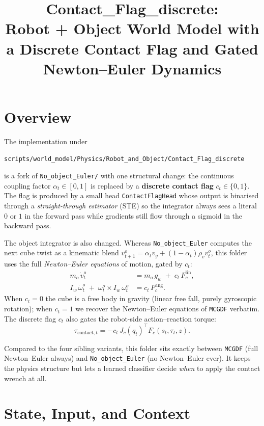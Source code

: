 \documentclass[11pt]{article}
\title{Contact\_Flag\_discrete:\\Robot + Object World Model with a Discrete Contact Flag and Gated Newton--Euler Dynamics}
\author{}
\date{}
\begin{document}
\maketitle

\section{Overview}

The implementation under
\begin{center}
\texttt{scripts/world\_model/Physics/Robot\_and\_Object/Contact\_Flag\_discrete}
\end{center}
is a fork of \texttt{No\_object\_Euler/} with one structural change:
the continuous coupling factor $\alpha_t \in [0,1]$ is replaced by a
\textbf{discrete contact flag}
\(
  c_t \in \{0, 1\}.
\)
The flag is produced by a small head \texttt{ContactFlagHead} whose
output is binarised through a \emph{straight-through estimator} (STE)
so the integrator always sees a literal $0$ or $1$ in the forward
pass while gradients still flow through a sigmoid in the backward
pass.

The object integrator is also changed.  Whereas
\texttt{No\_object\_Euler} computes the next cube twist as a kinematic
blend
\(
  v^o_{t+1} = \alpha_t v_g + (1-\alpha_t) \rho_v v^o_t
\),
this folder uses the full \emph{Newton--Euler equations} of motion,
gated by $c_t$:
\begin{align}
  m_o\,\dot v^o_t
    &= m_o\,g_w \;+\; c_t\,F_c^{\mathrm{lin}}, \\
  I_w\,\dot \omega^o_t \;+\; \omega^o_t \times I_w\,\omega^o_t
    &= c_t\,F_c^{\mathrm{ang}}.
\end{align}
When $c_t = 0$ the cube is a free body in gravity (linear free fall,
purely gyroscopic rotation); when $c_t = 1$ we recover the
Newton--Euler equations of \texttt{MCGDF} verbatim.  The discrete
flag $c_t$ also gates the robot-side action--reaction torque:
\begin{equation}
  \tau_{\mathrm{contact},t} = -c_t\,J_c(q_t)^\top F_c(s_t, \tau_t, z).
  \label{eq:cfd-robot-coupling}
\end{equation}

Compared to the four sibling variants, this folder sits exactly
between \texttt{MCGDF} (full Newton--Euler always) and
\texttt{No\_object\_Euler} (no Newton--Euler ever).  It keeps the
physics structure but lets a learned classifier decide \emph{when} to
apply the contact wrench at all.

\section{State, Input, and Context}
\end{document}
